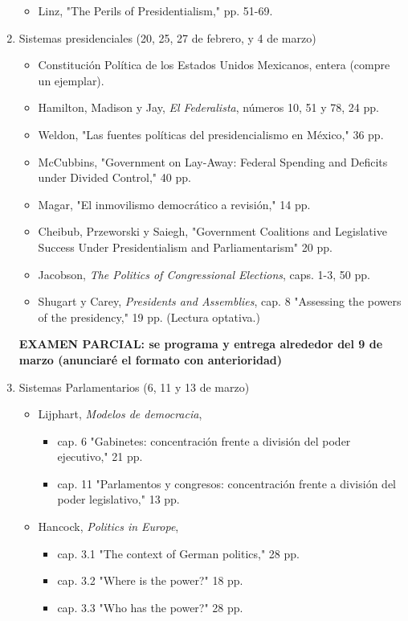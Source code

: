 \documentclass{article}
\begin{document}
\begin{enumerate}
\begin{itemize}
\item Linz, "The Perils of Presidentialism," pp. 51-69.
\end{itemize}
\item Sistemas presidenciales  (20, 25, 27 de febrero, y 4 de marzo)
\label{sec:orgb5210e2}
\begin{itemize}
\item Constitución Política de los Estados Unidos Mexicanos, entera (compre un ejemplar).
\item Hamilton, Madison y Jay, \emph{El Federalista}, números 10, 51 y 78, 24 pp.
\item Weldon, "Las fuentes políticas del presidencialismo en México," 36 pp.
\item McCubbins, "Government on Lay-Away: Federal Spending and Deficits under Divided Control," 40 pp.
\item Magar, "El inmovilismo democrático a revisión," 14 pp.
\item Cheibub, Przeworski y Saiegh, "Government Coalitions and Legislative Success Under Presidentialism and Parliamentarism" 20 pp.
\item Jacobson, \emph{The Politics of Congressional Elections}, caps. 1-3, 50 pp.
\item Shugart y Carey, \emph{Presidents and Assemblies}, cap. 8 "Assessing the powers of the presidency," 19 pp.   (Lectura optativa.)
\end{itemize}
\textbf{EXAMEN PARCIAL: se programa y entrega alrededor del 9 de marzo (anunciaré el formato con anterioridad)}
\item Sistemas Parlamentarios  (6, 11 y 13 de marzo)
\label{sec:org740294a}
\begin{itemize}
\item Lijphart, \emph{Modelos de democracia}, 
\begin{itemize}
\item cap. 6 "Gabinetes: concentración frente a división del poder ejecutivo," 21 pp.
\item cap. 11 "Parlamentos y congresos: concentración frente a división del poder legislativo," 13 pp.
\end{itemize}
\item Hancock, \emph{Politics in Europe}, 
\begin{itemize}
\item cap. 3.1 "The context of German politics," 28 pp.
\item cap. 3.2 "Where is the power?" 18 pp.
\item cap. 3.3 "Who has the power?" 28 pp.

\end{itemize}
\end{itemize}
\end{enumerate}
\end{document}
